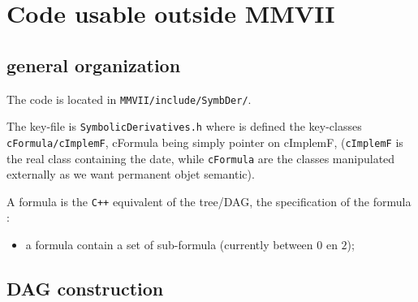 \section{Code usable outside  MMVII}

\subsection{general organization}

The code is located in  {\tt MMVII/include/SymbDer/}.

The key-file is {\tt SymbolicDerivatives.h}  where is defined   the key-classes   {\tt cFormula/cImplemF},
cFormula being simply pointer on cImplemF,  ({\tt cImplemF} is the real class containing the date, while
{\tt cFormula} are the classes manipulated externally as we want permanent objet  semantic).


A formula is the {\tt C++} equivalent of the tree/DAG, the specification of the formula :

\begin{itemize}
	\item  a formula contain a set of sub-formula (currently between $0$ en $2$);
\end{itemize}







\subsection{DAG construction}
